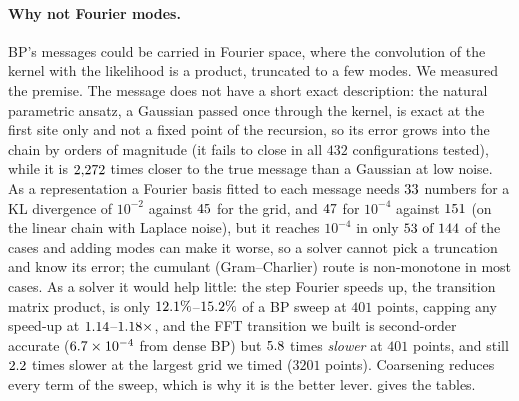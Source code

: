 \paragraph{Why not Fourier modes.}
BP's messages could be carried in Fourier space, where the convolution of the kernel with the likelihood is a
product, truncated to a few modes. We measured the premise. The message does not have a short exact description:
the natural parametric ansatz, a Gaussian passed once through the kernel, is exact at the first site only
and not a fixed point of the recursion, so its error grows into the chain by orders of magnitude (it fails to
close in all $432$ configurations tested), while it is $2{,}272$ times closer to the true message
than a Gaussian at low noise. As a representation a Fourier basis fitted to each message needs
$33$ numbers for a KL divergence of $10^{-2}$ against $45$ for the grid, and
$47$ for $10^{-4}$ against $151$ (on the linear chain with Laplace noise), but it reaches
$10^{-4}$ in only $\text{53 of 144}$ of the cases and adding modes can make it worse, so a solver cannot pick a truncation and
know its error; the cumulant (Gram--Charlier) route is non-monotone in most cases. As a solver it would help
little: the step Fourier speeds up, the transition matrix product, is only $12.1\%$--$15.2\%$ of a BP
sweep at $401$ points, capping any speed-up at $1.14$--$1.18\times$, and the FFT transition we built is
second-order accurate ($6.7\times10^{-4}$ from dense BP) but $5.8$ times \emph{slower} at $401$ points, and still
$2.2$ times slower at the largest grid we timed ($3201$ points). Coarsening reduces every term of the sweep, which is why it is the better lever.
 gives the tables.
